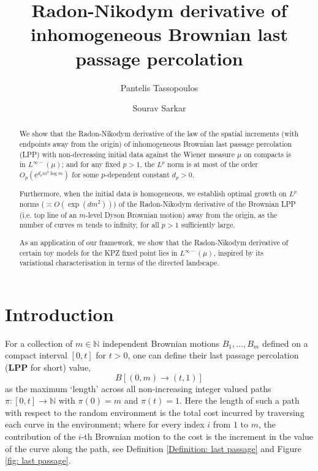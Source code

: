 \documentclass[11pt, reqno]{amsart}
\title{Radon-Nikodym derivative of inhomogeneous Brownian last passage percolation}
\author{Pantelis Tassopoulos}
\author{Sourav Sarkar}
\numberwithin{equation}{section}
\newcommand{\N}{\ensuremath{\mathbb{N}}}
\begin{document}
\date{}

\begin{abstract}
We show that the Radon-Nikodym derivative of the law of the spatial increments (with endpoints away from the origin) of inhomogeneous Brownian last passage percolation (LPP) with non-decreasing initial data against the Wiener measure $\mu$ on compacts is in $L^{\infty-}(\mu)$; and for any fixed $p>1$, the $L^p$ norm is at most of the order $O_p(\mathrm{e}^{d_pm^2\log m})$ for some $p$-dependent constant $d_p>0$.

Furthermore, when the initial data is homogeneous, we establish optimal growth on $L^p$ norms ($\asymp O(\exp(dm^2))$) of the Radon-Nikodym derivative of the Brownian LPP (i.e. top line of an $m$-level Dyson Brownian motion) away from the origin, as the number of curves $m$ tends to infinity, for all $p>1$ sufficiently large.

As an application of our framework, we show that the Radon-Nikodym derivative of certain toy models for the KPZ fixed point lies in $L^{\infty-}(\mu)$, inspired by its variational characterisation in terms of the directed landscape.
\end{abstract}

\maketitle

\tableofcontents

\section{Introduction}
For a collection of $m\in \N$ independent Brownian motions $B_1, \ldots, B_m$ defined on a compact interval $[0,t]$ for $t>0$, one can define their last passage percolation (\textbf{LPP} for short) value,
\[
B[(0,m)\to (t,1)]
\]
as the maximum `length' across all non-increasing integer valued paths $\pi:[0,t]\to \N$ with $\pi(0) = m$ and $\pi(t)=1$. Here the length of such a path with respect to the random environment is the total cost incurred by traversing each curve in the  environment; where for every index $i$ from $1$ to $m$, the contribution of the $i$-th Brownian motion to the cost is the increment in the value of the curve along the path, see Definition \ref{Definition: last passage} and Figure \ref{fig: last passage}. 
\end{document}
